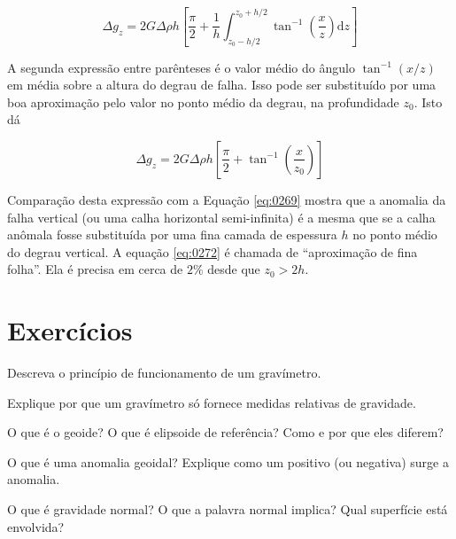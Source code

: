 \documentclass[]{book}
\theoremstyle{definition}
\theoremstyle{definition}
\theoremstyle{definition}
\theoremstyle{remark}
\let\BeginKnitrBlock\begin \let\EndKnitrBlock\end
\begin{document}
\begin{equation}
\Delta g_{z}=2 G \Delta \rho h\left[\frac{\pi}{2}+\frac{1}{h}\int_{z_{0}-h / 2}^{z_{0}+h / 2} \tan ^{-1}\left(\frac{x}{z}\right) \mathrm{d} z\right] \label{eq:0271}
\end{equation}

A segunda expressão entre parênteses é o valor médio do ângulo \(\tan ^{-1}(x / z)\) em média sobre a altura do degrau de falha. Isso pode ser substituído por uma boa aproximação pelo valor no ponto médio da degrau, na profundidade \(z_0\). Isto dá

\begin{equation}
\Delta g_{z}=2 G \Delta \rho h\left[\frac{\pi}{2}+\tan ^{-1}\left(\frac{x}{z_{0}}\right)\right] \label{eq:0272}
\end{equation}

Comparação desta expressão com a Equação \eqref{eq:0269} mostra que a anomalia da falha vertical (ou uma calha horizontal semi-infinita) é a mesma que se a calha anômala fosse substituída por uma fina camada de espessura \(h\) no ponto médio do degrau vertical. A equação \eqref{eq:0272} é chamada de ``aproximação de fina folha''. Ela é precisa em cerca de \(2\%\) desde que \(z_0>2h\).

\hypertarget{exercicios}{%
\section{Exercícios}\label{exercicios}}

\BeginKnitrBlock{exercise}
\protect\hypertarget{exr:exr1}{}{\label{exr:exr1} } Descreva o princípio de funcionamento de um gravímetro.
\EndKnitrBlock{exercise}

\BeginKnitrBlock{exercise}
\protect\hypertarget{exr:exr2}{}{\label{exr:exr2} }Explique por que um gravímetro só fornece medidas relativas de gravidade.
\EndKnitrBlock{exercise}

\BeginKnitrBlock{exercise}
\protect\hypertarget{exr:exr3}{}{\label{exr:exr3} }O que é o geoide? O que é elipsoide de referência? Como e por que eles diferem?
\EndKnitrBlock{exercise}

\BeginKnitrBlock{exercise}
\protect\hypertarget{exr:exr4}{}{\label{exr:exr4} } O que é uma anomalia geoidal? Explique como um positivo (ou negativa) surge a anomalia.
\EndKnitrBlock{exercise}

\BeginKnitrBlock{exercise}
\protect\hypertarget{exr:exr5}{}{\label{exr:exr5} }O que é gravidade normal? O que a palavra normal implica? Qual superfície está envolvida?
\EndKnitrBlock{exercise}
\end{document}
